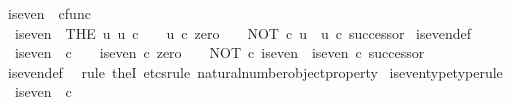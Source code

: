\begin{isabellebody}
\endisadelimproof
%
\isadelimdocument
%
\endisadelimdocument
%
\isatagdocument
%
\isamarkuptrue%
%
\endisatagdocument
{\isafolddocument}%
%
\isadelimdocument
%
\endisadelimdocument
{}\isamarkupfalse%
\ is{\isacharunderscore}{\kern0pt}even\ {\isacharcolon}{\kern0pt}{\isacharcolon}{\kern0pt}\ {\isachardoublequoteopen}cfunc{\isachardoublequoteclose}\ \isanewline
\ \ {\isachardoublequoteopen}is{\isacharunderscore}{\kern0pt}even\ {\isacharequal}{\kern0pt}\ {\isacharparenleft}{\kern0pt}THE\ u{\isachardot}{\kern0pt}\ u{\isacharcolon}{\kern0pt}\ {\isasymnat}\isactrlsub c\ {\isasymrightarrow}\ {\isasymOmega}\ {\isasymand}\ u\ {\isasymcirc}\isactrlsub c\ zero\ {\isacharequal}{\kern0pt}\ {\isasymt}\ {\isasymand}\ NOT\ {\isasymcirc}\isactrlsub c\ u\ {\isacharequal}{\kern0pt}\ u\ {\isasymcirc}\isactrlsub c\ successor{\isacharparenright}{\kern0pt}{\isachardoublequoteclose}\isanewline
\isanewline
{}\isamarkupfalse%
\ is{\isacharunderscore}{\kern0pt}even{\isacharunderscore}{\kern0pt}def{}{\isacharcolon}{\kern0pt}\isanewline
\ \ {\isachardoublequoteopen}is{\isacharunderscore}{\kern0pt}even\ {\isacharcolon}{\kern0pt}\ {\isasymnat}\isactrlsub c\ {\isasymrightarrow}\ {\isasymOmega}\ {\isasymand}\ is{\isacharunderscore}{\kern0pt}even\ {\isasymcirc}\isactrlsub c\ zero\ {\isacharequal}{\kern0pt}\ {\isasymt}\ {\isasymand}\ NOT\ {\isasymcirc}\isactrlsub c\ is{\isacharunderscore}{\kern0pt}even\ {\isacharequal}{\kern0pt}\ is{\isacharunderscore}{\kern0pt}even\ {\isasymcirc}\isactrlsub c\ successor{\isachardoublequoteclose}\isanewline
%
\isadelimproof
\ \ %
\endisadelimproof
%
\isatagproof
{}\isamarkupfalse%
\ is{\isacharunderscore}{\kern0pt}even{\isacharunderscore}{\kern0pt}def\ \isamarkupfalse%
\ {\isacharparenleft}{\kern0pt}rule\ theI{\isacharprime}{\kern0pt}{\isacharcomma}{\kern0pt}\ etcs{\isacharunderscore}{\kern0pt}rule\ natural{\isacharunderscore}{\kern0pt}number{\isacharunderscore}{\kern0pt}object{\isacharunderscore}{\kern0pt}property{}{\isacharparenright}{\kern0pt}%
\endisatagproof
{\isafoldproof}%
%
\isadelimproof
\isanewline
%
\endisadelimproof
\isanewline
{}\isamarkupfalse%
\ is{\isacharunderscore}{\kern0pt}even{\isacharunderscore}{\kern0pt}type{\isacharbrackleft}{\kern0pt}type{\isacharunderscore}{\kern0pt}rule{\isacharbrackright}{\kern0pt}{\isacharcolon}{\kern0pt}\isanewline
\ \ {\isachardoublequoteopen}is{\isacharunderscore}{\kern0pt}even\ {\isacharcolon}{\kern0pt}\ {\isasymnat}\isactrlsub c\ {\isasymrightarrow}\ {\isasymOmega}{\isachardoublequoteclose}\isanewline

\end{isabellebody}

